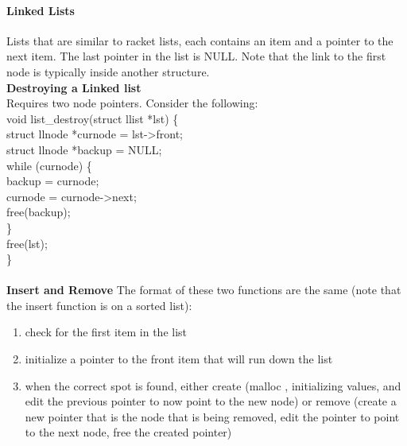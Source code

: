 \documentclass[10pt,letter]{article}
\begin{document}
{\paragraph{Linked Lists} Lists that are similar to racket lists, each contains an item and a pointer to the next item. The last pointer in the list is NULL. Note that the link to the first node is typically inside another structure. \\ 
\textbf{Destroying a Linked list}\\ 
Requires two node pointers. Consider the following: \\ 
void list\_destroy(struct llist *lst) \{ \\ 
\hspace*{5pt} struct llnode *curnode = lst->front; \\  
\hspace*{5pt} struct llnode *backup = NULL; \\ 
\hspace*{5pt} while (curnode) \{ \\
\hspace*{10pt} backup = curnode; \\ 
\hspace*{10pt} curnode = curnode->next; \\ 
\hspace*{10pt} free(backup);\\ 
\hspace*{5pt} \}\\ 
\hspace*{5pt} free(lst);\\
\}\\ \\ 
\textbf{Insert and Remove} The format of these two functions are the same (note that the insert function is on a sorted list): \begin{enumerate}
    \item check for the first item in the list 
    \item initialize a pointer to the front item that will run down the list 
    \item when the correct spot is found, either create (malloc , initializing values, and edit the previous pointer to now point to the new node) or remove (create a new pointer that is the node that is being removed, edit the pointer to point to the next node, free the created pointer) 
\end{enumerate}

}
\end{document}
